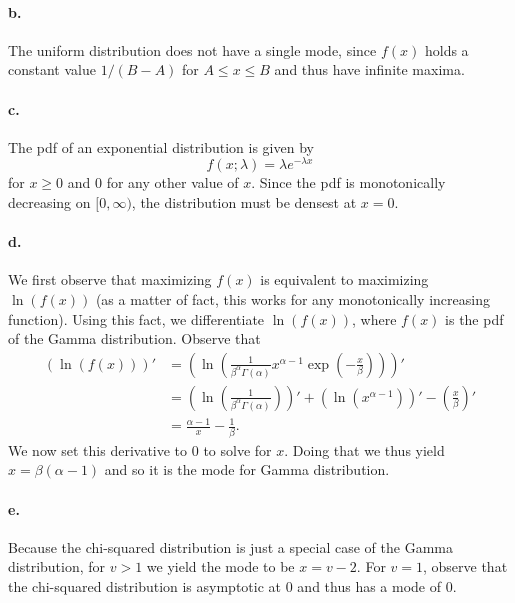 \documentclass{exam}
\newcommand{\paren}[1]{\left(#1\right)}
\begin{document}
\paragraph{b.} The uniform distribution does not have a single mode, since $f(x)$ holds a constant value $1/(B - A)$ for $A \le x \le B$ and thus have infinite maxima.

\paragraph{c.} The pdf of an exponential distribution is given by
\[
	f(x; \lambda) = \lambda e^{-\lambda x}
\]
for $x \ge 0$ and $0$ for any other value of $x$. Since the pdf is monotonically decreasing on $[0, \infty)$, the distribution must be densest at $x = 0$.

\paragraph{d.} We first observe that maximizing $f(x)$ is equivalent to maximizing $\ln(f(x))$ (as a matter of fact, this works for any monotonically increasing function). Using this fact, we differentiate $\ln(f(x))$, where $f(x)$ is the pdf of the Gamma distribution. Observe that
\begin{align*}
	(\ln(f(x)))' &= \paren{\ln\paren{\frac1{\beta^\alpha \Gamma(\alpha)}x^{\alpha - 1}\exp\paren{-\frac{x}{\beta}}}}' \\
	&= \paren{\ln\paren{\frac1{\beta^\alpha \Gamma(\alpha)}}}' + (\ln(x^{\alpha - 1}))' - \paren{\frac{x}{\beta}}' \\
	&= \frac{\alpha - 1}{x} - \frac1\beta.
\end{align*}
We now set this derivative to $0$ to solve for $x$. Doing that we thus yield $x = \beta(\alpha - 1)$ and so it is the mode for Gamma distribution.

\paragraph{e.} Because the chi-squared distribution is just a special case of the Gamma distribution, for $v > 1$ we yield the mode to be $x = v - 2$. For $v = 1$, observe that the chi-squared distribution is asymptotic at $0$ and thus has a mode of $0$.
\end{document}

